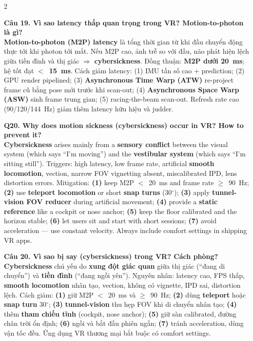 \begin{paracol}{2}
\switchcolumn

\textbf{Câu 19. Vì sao latency thấp quan trọng trong VR? Motion-to-photon là gì?}\\
\textbf{Motion-to-photon (M2P) latency} là tổng thời gian từ khi đầu chuyển động thực tới khi photon tới mắt. Nếu M2P cao, ảnh trễ so với đầu, não phát hiện lệch giữa tiền đình và thị giác $\Rightarrow$ \textbf{cybersickness}. Đồng thuận: \textbf{M2P dưới 20~ms}; hệ tốt đạt \textbf{$<$~15~ms}. Cách giảm latency: (1) IMU tần số cao + prediction; (2) GPU render pipelined; (3) \textbf{Asynchronous Time Warp (ATW)} re-project frame cũ bằng pose mới trước khi scan-out; (4) \textbf{Asynchronous Space Warp (ASW)} sinh frame trung gian; (5) racing-the-beam scan-out. Refresh rate cao (90/120/144~Hz) giảm thêm latency hữu hiệu và judder.

\switchcolumn*

\textbf{Q20. Why does motion sickness (cybersickness) occur in VR? How to prevent it?}\\
\textbf{Cybersickness} arises mainly from a \textbf{sensory conflict} between the visual system (which says ``I'm moving'') and the \textbf{vestibular system} (which says ``I'm sitting still''). Triggers: high latency, low frame rate, artificial \textbf{smooth locomotion}, vection, narrow FOV vignetting absent, miscalibrated IPD, lens distortion errors. Mitigation: \textbf{(1)} keep M2P $<$~20~ms and frame rate $\geq$~90~Hz; \textbf{(2)} use \textbf{teleport locomotion} or short \textbf{snap turns} (30$^\circ$); \textbf{(3)} apply \textbf{tunnel-vision FOV reducer} during artificial movement; \textbf{(4)} provide a \textbf{static reference} like a cockpit or nose anchor; \textbf{(5)} keep the floor calibrated and the horizon stable; \textbf{(6)} let users sit and start with short sessions; \textbf{(7)} avoid acceleration --- use constant velocity. Always include comfort settings in shipping VR apps.

\switchcolumn

\textbf{Câu 20. Vì sao bị say (cybersickness) trong VR? Cách phòng?}\\
\textbf{Cybersickness} chủ yếu do \textbf{xung đột giác quan} giữa thị giác (``đang di chuyển'') và \textbf{tiền đình} (``đang ngồi yên''). Nguyên nhân: latency cao, FPS thấp, \textbf{smooth locomotion} nhân tạo, vection, không có vignette, IPD sai, distortion lệch. Cách giảm: \textbf{(1)} giữ M2P $<$~20~ms và $\geq$~90~Hz; \textbf{(2)} dùng \textbf{teleport} hoặc \textbf{snap turn} 30$^\circ$; \textbf{(3)} \textbf{tunnel-vision} thu hẹp FOV khi di chuyển nhân tạo; \textbf{(4)} thêm \textbf{tham chiếu tĩnh} (cockpit, nose anchor); \textbf{(5)} giữ sàn calibrated, đường chân trời ổn định; \textbf{(6)} ngồi và bắt đầu phiên ngắn; \textbf{(7)} tránh acceleration, dùng vận tốc đều. Ứng dụng VR thương mại bắt buộc có comfort settings.


\end{paracol}
